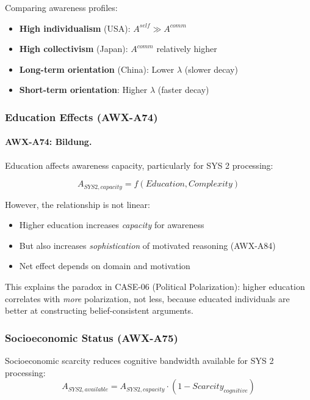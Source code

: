 \begin{example}
Comparing awareness profiles:
\begin{itemize}
    \item \textbf{High individualism} (USA): $A^{self} \gg A^{comm}$
    \item \textbf{High collectivism} (Japan): $A^{comm}$ relatively higher
    \item \textbf{Long-term orientation} (China): Lower $\lambda$ (slower decay)
    \item \textbf{Short-term orientation}: Higher $\lambda$ (faster decay)
\end{itemize}
\end{example}

\subsubsection{Education Effects (AWX-A74)}

\paragraph{AWX-A74: Bildung.}
Education affects awareness capacity, particularly for SYS 2 processing:

\begin{equation}
A_{SYS2,capacity} = f(Education, Complexity)
\end{equation}

However, the relationship is not linear:
\begin{itemize}
    \item Higher education increases \emph{capacity} for awareness
    \item But also increases \emph{sophistication} of motivated reasoning 
          (AWX-A84)
    \item Net effect depends on domain and motivation
\end{itemize}

This explains the paradox in CASE-06 (Political Polarization): higher 
education correlates with \emph{more} polarization, not less, because 
educated individuals are better at constructing belief-consistent arguments.

\subsubsection{Socioeconomic Status (AWX-A75)}

\begin{axiom}
Socioeconomic scarcity reduces cognitive bandwidth available for 
SYS 2 processing:
\begin{equation}
A_{SYS2,available} = A_{SYS2,capacity} \cdot (1 - Scarcity_{cognitive})
\end{equation}
\end{axiom}

